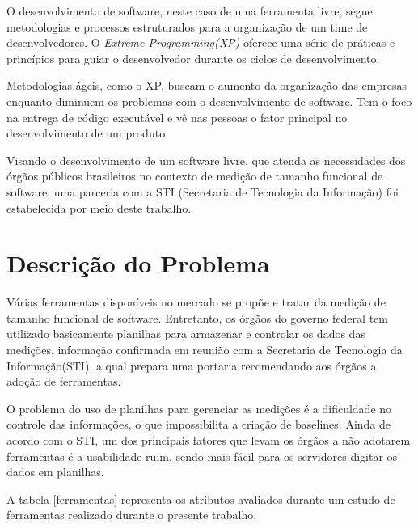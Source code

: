 O desenvolvimento de software, neste caso de uma ferramenta livre, segue metodologias e processos estruturados para a organização de um time de desenvolvedores. O \textit{Extreme Programming(XP)} oferece uma série de práticas e princípios para guiar o desenvolvedor durante os ciclos de desenvolvimento.

Metodologias ágeis, como o XP, buscam o aumento da organização das empresas enquanto diminuem os problemas com o desenvolvimento de software. Tem o foco na entrega de código executável e vê nas pessoas o fator principal no desenvolvimento de um produto. \cite{Maurer:2002}

Visando o desenvolvimento de um software livre, que atenda as necessidades dos órgãos públicos brasileiros no contexto de medição de tamanho funcional de software, uma parceria com a STI (Secretaria de Tecnologia da Informação) foi estabelecida por meio deste trabalho.

\section{Descrição do Problema}

Várias ferramentas disponíveis no mercado se propõe e tratar da medição de tamanho funcional de software. Entretanto, os órgãos do governo federal tem utilizado basicamente planilhas para armazenar e controlar os dados das medições, informação confirmada em reunião com a Secretaria de Tecnologia da Informação(STI), a qual prepara uma portaria recomendando aos órgãos a adoção de ferramentas.

O problema do uso de planilhas para gerenciar as medições é a dificuldade no controle das informações, o que impossibilita a criação de baselines. Ainda de acordo com o STI, um dos principais fatores que levam os órgãos a não adotarem ferramentas é a usabilidade ruim, sendo mais fácil para os servidores digitar os dados em planilhas.

A tabela \ref{ferramentas} representa os atributos avaliados durante um estudo de ferramentas realizado durante o presente trabalho.


